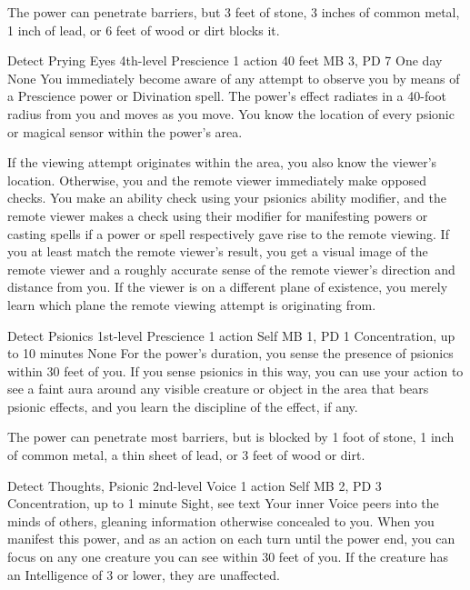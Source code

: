 The power can penetrate barriers, but 3 feet of stone, 3 inches
of common metal, 1 inch of lead, or 6 feet of wood or dirt
blocks it.

\DndPowerHeader%
    {Detect Prying Eyes\label{pwr:detect-prying-eyes}}
    {4th-level Prescience}
    {1 action}
    {40 feet}
    {MB 3, PD 7}
    {One day}
    {None}
You immediately become aware of any attempt
to observe you by means of a Prescience power or Divination
spell. The power's effect radiates in a 40-foot radius from
you and moves as you move. You know the location of every
psionic or magical sensor within the power's area.

If the viewing attempt originates within the area, you also
know the viewer's location. Otherwise, you and the remote
viewer immediately make opposed checks. You make an ability
check using your psionics ability modifier, and the remote
viewer makes a check using their modifier for manifesting
powers or casting spells if a power or spell respectively
gave rise to the remote viewing. If you at least match the
remote viewer's result, you get a visual image of the remote
viewer and a roughly accurate sense of the remote viewer's
direction and distance from you.
If the viewer is on a different plane of existence,
you merely learn which plane the remote viewing attempt is
originating from.

\DndPowerHeader%
    {Detect Psionics\label{pwr:detect-psionics}}
    {1st-level Prescience}
    {1 action}
    {Self}
    {MB 1, PD 1}
    {Concentration, up to 10 minutes}
    {None}
For the power's duration, you sense the
presence of psionics within 30 feet of you. If you sense psionics
in this way, you can use your action to see a faint aura around
any visible creature or object in the area that bears psionic
effects, and you learn the discipline of the effect, if any.

The power can penetrate most barriers, but is blocked by 1
foot of stone, 1 inch of common metal, a thin sheet of lead,
or 3 feet of wood or dirt.

\DndPowerHeader%
    {Detect Thoughts, Psionic\label{pwr:detect-thoughts-psionic}}
    {2nd-level Voice}
    {1 action}
    {Self}
    {MB 2, PD 3}
    {Concentration, up to 1 minute}
    {Sight, see text}
Your inner Voice peers into the minds of others,
gleaning information otherwise concealed to you.
When you manifest this power,
and as an action on each turn until the power end,
you can focus on any one creature you can see within 30 feet of you.
If the creature has an Intelligence of 3 or lower,
they are unaffected.

